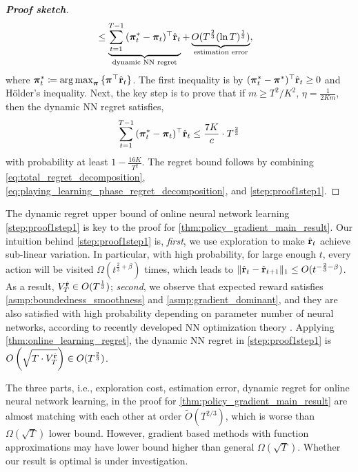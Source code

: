 \begin{proof}[\bf Proof sketch]
\begin{equation}
{\begin{split}
&\le \underbrace{ \sum\limits_{t=1}^{T-1}{ ( {{\boldsymbol{\pi}}_t^*} - {\boldsymbol{\pi}}_t )^\top \hat{{\mathbf{r}}}_t  } }_{\text{dynamic NN regret}} + \underbrace{ O(T^{\frac{2}{3}}( \ln{T} )^{\frac{1}{3}}) }_{\text{estimation error}},
\end{split}
}
\end{equation}
where ${\boldsymbol{\pi}}_t^* \coloneqq \operatorname*{arg\,max}_{{\boldsymbol{\pi}} }{\{ {\boldsymbol{\pi}}^\top \hat{{\mathbf{r}}}_t\}}$. The first inequality is by $( {\boldsymbol{\pi}}_t^* - {\boldsymbol{\pi}}^*)^\top \hat{{\mathbf{r}}}_t \ge 0$ and H{\" o}lder's inequality. Next, the key step is to prove that if $m \ge T^2 /K^2$, $\eta = \frac{1}{2 K m}$, then the dynamic NN regret satisfies,
\begin{equation}
\label{step:proof1step1}
\begin{split}
\sum\limits_{t=1}^{T-1}{ (  {{\boldsymbol{\pi}}_t^*} - {\boldsymbol{\pi}}_t )^\top \hat{{\mathbf{r}}}_t } \le \frac{7 K}{c} \cdot  T^{\frac{2}{3}}
\end{split}
\end{equation}
with probability at least $1 - \frac{16 K}{T^2}$.
The regret bound follows by combining \cref{eq:total_regret_decomposition}, \cref{eq:playing_learning_phase_regret_decomposition}, and \cref{step:proof1step1}.
\end{proof}
The dynamic regret upper bound of online neural network learning \cref{step:proof1step1} is key to the proof for \cref{thm:policy_gradient_main_result}. Our intuition behind \cref{step:proof1step1} is, \textit{first}, we use exploration to make $\hat{{\mathbf{r}}}_t$ achieve sub-linear variation. In particular, with high probability, for large enough $t$, every action will be visited $\Omega(t^{\frac{2}{3}+ \beta})$ times, which leads to $\| \hat{{\mathbf{r}}}_t  - \hat{{\mathbf{r}}}_{t+1} \|_1 \le O(t^{-\frac{2}{3} - \beta})$. As a result, $V_T^{\hat{{\mathbf{r}}}} \in O(T^{\frac{1}{3}})$; \textit{second}, we observe that expected reward satisfies \cref{asmp:boundedness_smoothness} and \cref{asmp:gradient_dominant}, and they are also satisfied with high probability depending on parameter number of neural networks, according to recently developed NN optimization theory \citep{li2018learning,allen2018convergenceB}. Applying \cref{thm:online_learning_regret}, the dynamic NN regret in \cref{step:proof1step1} is $O\left(\sqrt{T \cdot V_T^{\hat{{\mathbf{r}}}} }\right) \in O(T^{\frac{2}{3}})$.

\begin{remk}
The three parts, i.e., exploration cost, estimation error, dynamic regret for online neural network learning, in the proof for \cref{thm:policy_gradient_main_result} are almost matching with each other at order $\tilde{O}(T^{2/3})$, which is worse than $\Omega(\sqrt{T})$ lower bound. However, gradient based methods with function approximations may have lower bound higher than general $\Omega(\sqrt{T})$. Whether our result is optimal is under investigation.
\end{remk}

